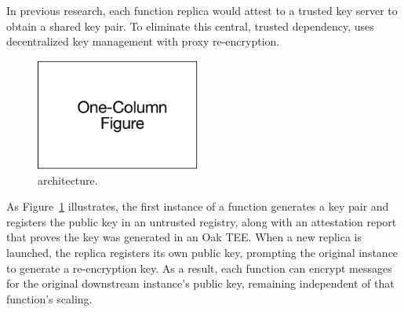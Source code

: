 %
In previous research, each function replica would attest to a trusted key
server to obtain a shared key pair.
%
To eliminate this central, trusted dependency, \SystemName
uses decentralized key management with proxy re-encryption.
%
\begin{figure}
    \centering
    \includegraphics[page = 4, width=0.48\textwidth]{diagrams/slides.pdf}
    \caption{\SystemName architecture.}
    \label{fig:arch}
\end{figure}
%
As Figure~\ref{fig:arch} illustrates, the first instance of a function
generates a key pair and registers the public key in an untrusted registry,
along with an attestation report that proves the key was generated in an Oak
TEE\@.
%
%
When a new replica is launched, the replica registers its own public key,
prompting the original instance to generate a re-encryption key.
%
%
As a result, each function can encrypt messages for the original downstream
instance's public key, remaining independent of that function's scaling.





